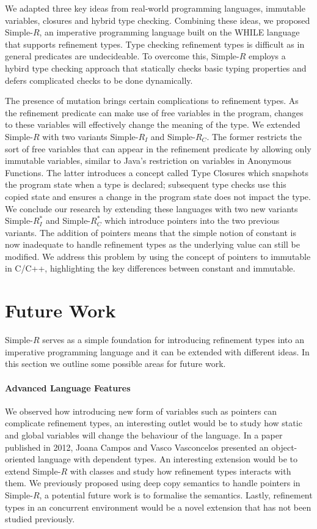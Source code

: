 \documentclass[a4paper,12pt]{report}
\begin{document}
\par
We adapted three key ideas from real-world programming languages, 
immutable variables, closures and hybrid type checking. Combining these 
ideas, we proposed Simple-$R$, an imperative programming language 
built on the WHILE language that supports refinement types. Type checking 
refinement types is difficult as in general predicates are 
undecideable. To overcome this, Simple-$R$ employs a hybird 
type checking approach that statically checks basic typing 
properties and defers complicated checks to be done dynamically. 

\par
The presence of mutation brings certain complications to refinement types. As 
the refinement predicate can make use of free variables in the program, changes 
to these variables will effectively change the meaning of the type. We extended 
Simple-$R$ with two variants Simple-$R_I$ and Simple-$R_C$. The former restricts 
the sort of free variables that can appear in the refinement predicate by allowing 
only immutable variables, similar to Java's restriction on variables in Anonymous 
Functions. The latter introduces a concept called Type Closures which snapshots 
the program state when a type is declared; subsequent type checks use this copied 
state and ensures a change in the program state does not impact the type. We 
conclude our research by extending these languages with two new variants 
Simple-$R^{*}_{I}$ and Simple-$R^{*}_{C}$ which introduce pointers into the two previous variants. The 
addition of pointers means that the simple notion of constant is now inadequate 
to handle refinement types as the underlying value can still be modified. We 
address this problem by using the concept of pointers to 
immutable in C/C++, highlighting the key differences between constant and immutable. 

\section{Future Work}
Simple-$R$ serves as a simple foundation for introducing refinement types 
into an imperative programming language and it can be extended with 
different ideas. In this section we outline some possible areas for future work. 

\paragraph{Advanced Language Features} We observed how introducing new form of 
variables such as pointers can complicate refinement types, an interesting 
outlet would be to study how static and global variables will change the 
behaviour of the language. In a paper \cite{objOritentedDependentType} published 
in 2012, Joana Campos and Vasco Vasconcelos presented an 
object-oriented language with dependent types. An interesting 
extension would be to extend Simple-$R$ with classes and study how refinement 
types interacts with them. We previously proposed using deep copy semantics to 
handle pointers in Simple-$R$, a potential future work is to formalise 
the semantics. Lastly, refinement types in an concurrent 
environment would be a novel extension that has not been studied previously. 
\end{document}
